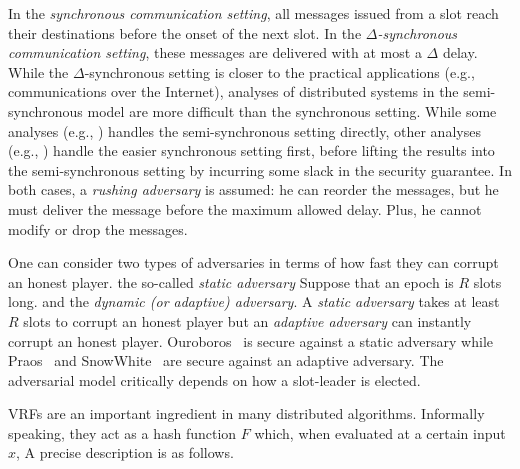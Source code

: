 In the \emph{synchronous communication setting}, 
all messages issued from a slot reach their destinations 
before the onset of the next slot.
In the \emph{$\Delta$-synchronous communication setting}, 
these messages are delivered with at most a $\Delta$ delay. 
While the $\Delta$-synchronous setting is closer to the practical applications 
(e.g., communications over the Internet), 
analyses of distributed systems in the semi-synchronous model 
are more difficult than the synchronous setting. 
While some analyses (e.g., \cite {SnowWhite,Sleepy,PSS}) 
handles the semi-synchronous setting directly,
other analyses (e.g., \cite{Praos}) handle the easier synchronous setting first, 
before lifting the results into the semi-synchronous setting 
by incurring some slack in the security guarantee. 
In both cases, a \emph{rushing adversary} is assumed: 
he can reorder the messages, but he must deliver the message before the maximum allowed delay. 
Plus, he cannot modify or drop the messages.




\label{sec:static-dynamic-adversary}
One can consider two types of adversaries in terms of 
how fast they can corrupt an honest player. the so-called \emph{static adversary} 
Suppose that an epoch is $R$ slots long. 
and the \emph{dynamic (or adaptive) adversary}. 
A \emph{static adversary} takes at least $R$ slots to corrupt an honest player 
but an \emph{adaptive adversary} can instantly corrupt an honest player. 
Ouroboros~\cite {Ouroboros} is secure against a static adversary 
while Praos~\cite {Praos} and SnowWhite~\cite{SnowWhite} 
are secure against an adaptive adversary.
The adversarial model critically depends on how a slot-leader is elected. 



VRFs are an important ingredient in many distributed algorithms. 
Informally speaking, they act as a hash function $F$ which, when evaluated at a certain input $x$, 
A precise description is as follows.

